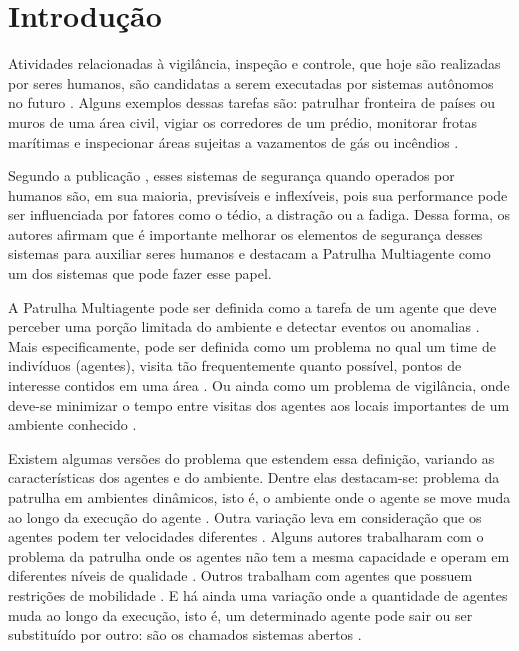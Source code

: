 \chapter{Introdução}
\label{chp:introduction}


Atividades relacionadas à vigilância, inspeção e controle, que hoje são 
realizadas por seres humanos, são candidatas a serem executadas por sistemas 
autônomos no futuro \citep{hernandez2013game}. Alguns exemplos dessas tarefas 
são: patrulhar fronteira de países ou muros de uma área civil, vigiar os 
corredores de um prédio, monitorar frotas marítimas e inspecionar áreas sujeitas 
a vazamentos de gás ou incêndios \citep{sampaiophd}.

Segundo a publicação \citep{hernandez2013game}, esses sistemas de segurança 
quando operados por humanos são, em sua maioria, previsíveis e inflexíveis, pois 
sua performance pode ser influenciada por fatores como o tédio, a distração ou a 
fadiga. Dessa forma, os autores afirmam que é importante melhorar os elementos 
de segurança desses sistemas para auxiliar seres humanos e destacam a Patrulha 
Multiagente \citep{Chevaleyre:2004:TAM:1018411.1019013} como um dos sistemas que 
pode fazer esse papel.

A Patrulha Multiagente pode ser definida como a tarefa de um agente que deve 
perceber uma porção limitada do ambiente e detectar eventos ou anomalias 
\citep{6315145}. Mais especificamente, pode ser definida como um problema no qual 
um time de indivíduos (agentes), visita tão frequentemente quanto possível, 
pontos de interesse contidos em uma área \citep{6495145}. Ou ainda como um 
problema de vigilância, onde deve-se minimizar o tempo entre visitas dos agentes 
aos locais importantes de um ambiente conhecido 
\citep{Pippin:2013:PBT:2480362.2480378}.

Existem algumas versões do problema que estendem essa definição, variando as 
características dos agentes e do ambiente. Dentre elas destacam-se: problema da 
patrulha em ambientes dinâmicos, isto é, o ambiente onde o agente se move muda 
ao longo da execução do agente \citep{6615158}. Outra variação leva em 
consideração que os agentes podem ter velocidades diferentes \citep{6900280}. 
Alguns autores trabalharam com o problema da patrulha onde os agentes não tem a 
mesma capacidade e operam em diferentes níveis de qualidade 
\citep{Pippin:2013:PBT:2480362.2480378}. Outros trabalham com agentes que 
possuem restrições de mobilidade \citep{6315145}. E há ainda uma variação onde a 
quantidade de agentes muda ao longo da execução, isto é, um determinado agente 
pode sair ou ser substituído por outro: são os chamados sistemas abertos 
\citep{6495145}.

